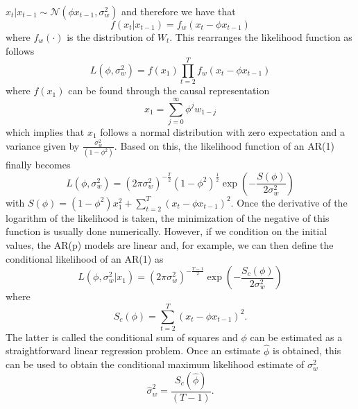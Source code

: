 \documentclass[]{book}
\theoremstyle{definition}
\theoremstyle{definition}
\theoremstyle{definition}
\theoremstyle{remark}
\begin{document}
\(x_t|x_{t-1} \sim \mathcal{N}(\phi x_{t-1},\sigma_w^2)\) and therefore
we have that \begin{equation*}
f(x_t|x_{t-1}) = f_w(x_t - \phi x_{t-1})
\end{equation*} where \(f_w(\cdot)\) is the distribution of \(W_t\).
This rearranges the likelihood function as follows \begin{equation*}
L(\phi,\sigma_w^2) = f(x_1)\prod_{t=2}^T f_w(x_t - \phi x_{t-1})
\end{equation*} where \(f(x_1)\) can be found through the causal
representation \begin{equation*}
x_1 = \sum_{j=0}^{\infty} \phi^j w_{1-j} 
\end{equation*} which implies that \(x_1\) follows a normal distribution
with zero expectation and a variance given by
\(\frac{\sigma_w^2}{(1-\phi^2)}\). Based on this, the likelihood
function of an AR(1) finally becomes \begin{equation*}
L(\phi,\sigma_w^2) = (2\pi \sigma_w^2)^{-\frac{T}{2}} (1 - \phi^2)^{\frac{1}{2}} \exp \left(-\frac{S(\phi)}{2 \sigma_w^2}\right)
\end{equation*} with
\(S(\phi) = (1-\phi^2) x_1^2 + \sum_{t=2}^T (x_t -\phi x_{t-1})^2\).
Once the derivative of the logarithm of the likelihood is taken, the
minimization of the negative of this function is usually done
numerically. However, if we condition on the initial values, the AR(p)
models are linear and, for example, we can then define the conditional
likelihood of an AR(1) as \begin{equation*}
L(\phi,\sigma_w^2|x_1) = (2\pi \sigma_w^2)^{-\frac{T-1}{2}} \exp \left(-\frac{S_c(\phi)}{2 \sigma_w^2}\right)
\end{equation*} where \begin{equation*}
S_c(\phi) = \sum_{t=2}^T (x_t -\phi x_{t-1})^2 .
\end{equation*} The latter is called the conditional sum of squares and
\(\phi\) can be estimated as a straightforward linear regression
problem. Once an estimate \(\hat{\phi}\) is obtained, this can be used
to obtain the conditional maximum likelihood estimate of \(\sigma_w^2\)
\begin{equation*}
\hat{\sigma}_w^2 = \frac{S_c(\hat{\phi})}{(T-1)} .
\end{equation*}
\end{document}
